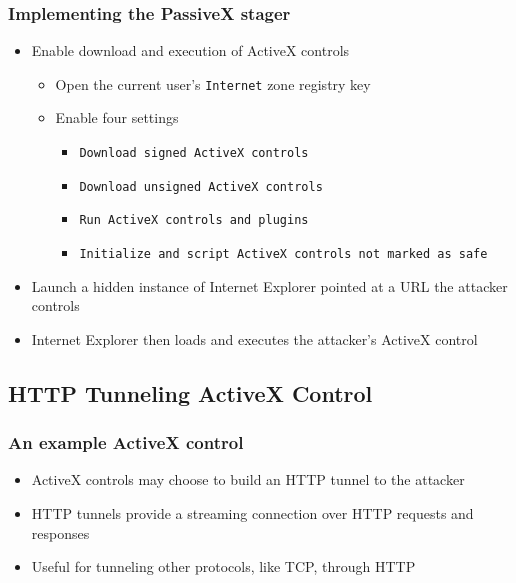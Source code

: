 \documentclass{beamer}
\newenvironment{sitemize}{\vspace{1mm}\begin{itemize}\itemsep 4pt\small}{\end{itemize}}
\begin{document}
\begin{frame}[t]
    \frametitle{Implementing the PassiveX stager}

    \begin{sitemize}
        \item Enable download and execution of ActiveX controls
        \begin{sitemize}
            \item Open the current user's \texttt{Internet} zone
            registry key
            \item Enable four settings
            \begin{sitemize}
                \item \texttt{Download signed ActiveX controls}
                \item \texttt{Download unsigned ActiveX controls}
                \item \texttt{Run ActiveX controls and plugins}
                \item \texttt{Initialize and script ActiveX controls not
            marked as safe}
            \end{sitemize}
        \end{sitemize}

        \pause
        \item Launch a hidden instance of Internet Explorer pointed
        at a URL the attacker controls

        \pause
        \item Internet Explorer then loads and executes the attacker's
        ActiveX control
    \end{sitemize}
\end{frame}

\subsection{HTTP Tunneling ActiveX Control}
\begin{frame}[t]
    \frametitle{An example ActiveX control}

    \begin{sitemize}
        \item ActiveX controls may choose to build an HTTP tunnel
        to the attacker
        \item HTTP tunnels provide a streaming connection over HTTP
        requests and responses
        \item Useful for tunneling other protocols, like TCP,
        through HTTP

    \end{sitemize}
\end{frame}
\end{document}
